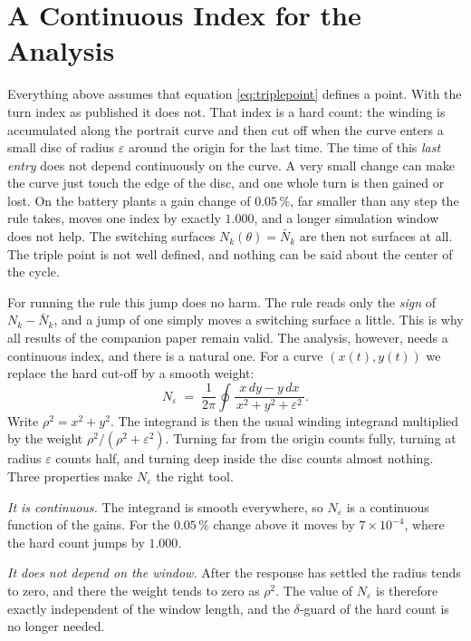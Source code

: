 \documentclass[letterpaper, 10pt, conference, twocolumn]{ieeeconf}
\newcommand{\Nbar}{\bar{N}}
\newcommand{\Neps}{N_{\varepsilon}}
\begin{document}
\section{A Continuous Index for the Analysis}
\label{sec:index}

Everything above assumes that equation \eqref{eq:triplepoint} defines a point.
With the turn index as published it does not. That index is a hard count: the
winding is accumulated along the portrait curve and then cut off when the curve
enters a small disc of radius $\varepsilon$ around the origin for the last
time. The time of this \emph{last entry} does not depend continuously on the
curve. A very small change can make the curve just touch the edge of the disc,
and one whole turn is then gained or lost. On the battery plants a gain change
of $0.05\,\%$, far smaller than any step the rule takes, moves one index by
exactly $1.000$, and a longer simulation window does not help. The switching
surfaces $N_k(\theta) = \Nbar_k$ are then not surfaces at all. The triple point
is not well defined, and nothing can be said about the center of the cycle.

For running the rule this jump does no harm. The rule reads only the
\emph{sign} of $N_k - \Nbar_k$, and a jump of one simply moves a switching
surface a little. This is why all results of the companion paper remain valid.
The analysis, however, needs a continuous index, and there is a natural one.
For a curve $(x(t), y(t))$ we replace the hard cut-off by a smooth weight:
\begin{equation}
\Neps \;=\; \frac{1}{2\pi} \oint
\frac{x\,dy - y\,dx}{\,x^2 + y^2 + \varepsilon^2\,}.
\label{eq:neps}
\end{equation}
Write $\rho^2 = x^2 + y^2$. The integrand is then the usual winding integrand
multiplied by the weight $\rho^2 / (\rho^2 + \varepsilon^2)$. Turning far from
the origin counts fully, turning at radius $\varepsilon$ counts half, and
turning deep inside the disc counts almost nothing. Three properties make
$\Neps$ the right tool.

\emph{It is continuous.} The integrand is smooth everywhere, so $\Neps$ is a
continuous function of the gains. For the $0.05\,\%$ change above it moves by
$7 \times 10^{-4}$, where the hard count jumps by $1.000$.

\emph{It does not depend on the window.} After the response has settled the
radius tends to zero, and there the weight tends to zero as $\rho^2$. The value
of $\Neps$ is therefore exactly independent of the window length, and the
$\delta$-guard of the hard count is no longer needed.
\end{document}
